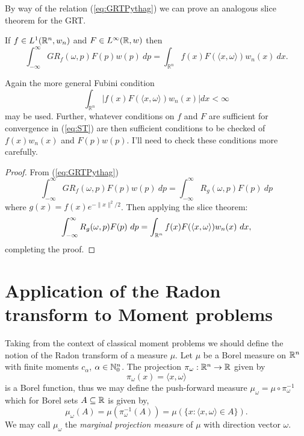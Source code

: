 By way of the relation (\ref{eq:GRTPythag}) we can prove an analogous slice theorem for the GRT.\@

\begin{theorem} 
  If $f \in L^1(\mathbb{R}^n, w_n)$ and $F \in L^\infty(\mathbb{R}, w)$ then
  \begin{equation}\label{eq:GST}
    \int_{-\infty}^\infty GR_f(\omega, p)F(p) w(p) ~dp
    = \int_{\mathbb{R}^n}f(x) F(\langle x, \omega\rangle) w_n(x) ~dx. 
  \end{equation}
\end{theorem}

\begin{remark}
  Again the more general Fubini condition 
  \[
    \int_{\mathbb{R}^n} |f(x) F(\langle x, \omega\rangle) w_n(x)| dx < \infty
  \]
  may be used. Further, whatever conditions on $f$ and $F$ are sufficient for convergence in (\ref{eq:ST}) are then sufficient conditions to be checked of $f(x)w_n(x)$ and $F(p)w(p)$. I'll need to check these conditions more carefully.
\end{remark}



\begin{proof}
  From (\ref{eq:GRTPythag})
  \[
    \int_{-\infty}^\infty GR_f(\omega, p)F(p) w(p) ~dp 
    = \int_{-\infty}^\infty R_g(\omega, p) F(p) ~dp
  \]
  where $g(x) = f(x)e^{-\|x\|^2/2}$. Then applying the slice theorem:
  \[
    \int_{-\infty}^\infty R_g(\omega, p) F(p) ~dp 
    = \int_{\mathbb{R}^n} f(x)F(\langle x, \omega \rangle) w_n(x) ~dx,
  \]
  completing the proof.
\end{proof}


\section{Application of the Radon transform to Moment problems}

Taking from the context of classical moment problems we should define the notion of the Radon transform of a measure $\mu$. Let $\mu$ be a Borel measure on $\mathbb{R}^n$ with finite moments $c_\alpha$, $\alpha \in \mathbb{N}_0^n$. The projection $\pi_\omega : \mathbb{R}^n \rightarrow \mathbb{R}$ given by
\[
  \pi_\omega(x) = \langle x, \omega \rangle
\] 
is a Borel function, thus we may define the push-forward measure $\mu_\omega = \mu \circ \pi_\omega^{-1}$ which for Borel sets $A \subseteq \mathbb{R}$ is given by,
\[
  \mu_\omega(A) = \mu(\pi_\omega^{-1}(A)) = \mu(\{x : \langle x, \omega \rangle \in A\}).
\]
We may call $\mu_\omega$ the \emph{marginal projection measure} of $\mu$ with direction vector $\omega$.

